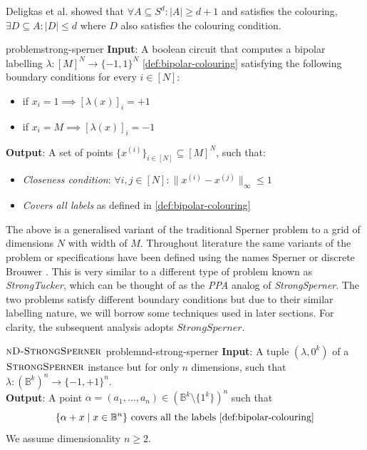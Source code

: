Deligkas et al. \cite{deligkas_PureCircuitTightInapproximability_2024, deligkas_ConstantInapproximabilityPPA_2022} showed that
$\forall A \subseteq S^d: |A| \geq d+1$ and satisfies the colouring, $\exists D \subseteq A: |D| \leq d$ where $D$ also satisfies
the colouring condition.

\begin{definitionbox}{ problem}{strong-sperner}
    \textbf{Input}: A boolean circuit that computes a bipolar labelling $\lambda: [M]^N \to \{-1, 1\}^N$ \ref{def:bipolar-colouring}
    satisfying the following boundary conditions for every $i \in [N]$:
    \begin{itemize}
        \item if $x_i = 1 \implies [\lambda(x)]_i = +1$
        \item if $x_i = M \implies [\lambda(x)]_i = -1$
    \end{itemize}
    \textbf{Output}: A set of points $\{x^{(i)}\}_{i \in [N]} \subseteq [M]^{N}$, such that:
    \begin{itemize}
        \item \textit{Closeness condition}: $\forall i,j \in [N]: \|x^{(i)} - x^{(j)}\|_{\infty} \leq 1$
        \item \textit{Covers all labels} as defined in \ref{def:bipolar-colouring}
    \end{itemize}
\end{definitionbox}


The above is a generalised variant of the traditional Sperner problem to
a grid of dimensions $N$ with width of $M$.
Throughout literature the same variants of the problem or specifications
have been defined using the names Sperner or discrete Brouwer \cite{chen_SettlingComplexityComputing_2009, chen_Complexity2DDiscrete_2009, daskalakis_ComplexityComputingNash_2006, deligkas_PureCircuitTightInapproximability_2024}.
This is very similar to a different type of problem known as \textit{StrongTucker}, which can be thought of as the
\textit{PPA} analog of \textit{StrongSperner}. The two problems satisfy different boundary conditions
but due to their similar labelling nature, we will borrow some techniques used in later sections.
For clarity, the subsequent analysis adopts $\textit{StrongSperner}$.

\begin{definitionbox}{$\textnormal{\textsc{nD-StrongSperner}}$ problem}{nd-strong-sperner}
    \textbf{Input}: A tuple $(\lambda,0^k)$ of a $\textnormal{\textsc{StrongSperner}}$ instance but for only $n$ dimensions, such that
    $\lambda : (\mathbb{B}^k)^n \to \{-1, +1\}^n$.\\
    \textbf{Output}: A point $\alpha = (a_1, \hdots, a_n) \in (\mathbb{B}^k \setminus \{1^k\})^n$ such that
    $$
        \{\alpha + x \mid x \in \mathbb{B}^n\} \text{ covers all the labels \ref{def:bipolar-colouring}}
    $$
    We assume dimensionality $n \geq 2$.
\end{definitionbox}

